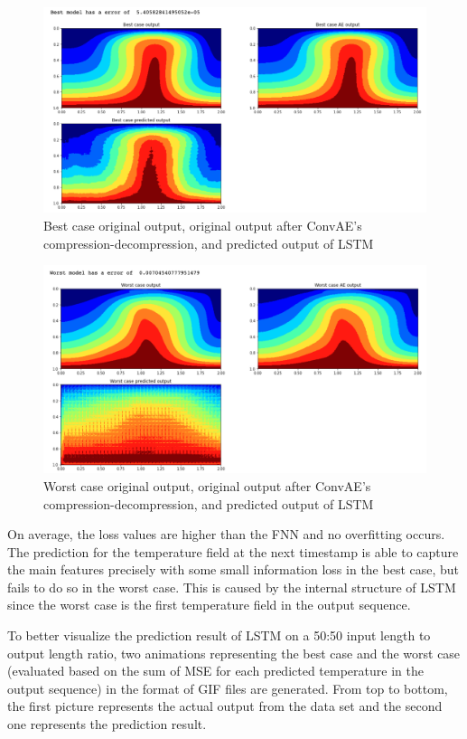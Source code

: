 \begin{figure}[H]
    \caption{Best case original output, original output after ConvAE's compression-decompression, and predicted output of LSTM}
    \includegraphics[scale=0.5]{figures/mantle_convection_images/limited_dataset/LSTM_Best.png}
\end{figure}

\begin{figure}[H]
    \caption{Worst case original output, original output after ConvAE's compression-decompression, and predicted output of LSTM}
    \includegraphics[scale=0.5]{figures/mantle_convection_images/limited_dataset/LSTM_Worst.png}
\end{figure}

On average, the loss values are higher than the FNN and no overfitting occurs. The prediction for the temperature field at the next timestamp is able to capture the main features precisely with some small information loss in the best case, but fails to do so in the worst case. This is caused by the internal structure of LSTM since the worst case is the first temperature field in the output sequence.

To better visualize the prediction result of LSTM on a 50:50 input length to output length ratio, two animations representing the best case and the worst case (evaluated based on the sum of MSE for each predicted temperature in the output sequence) in the format of GIF files are generated. From top to bottom, the first picture represents the actual output from the data set and the second one represents the prediction result.

